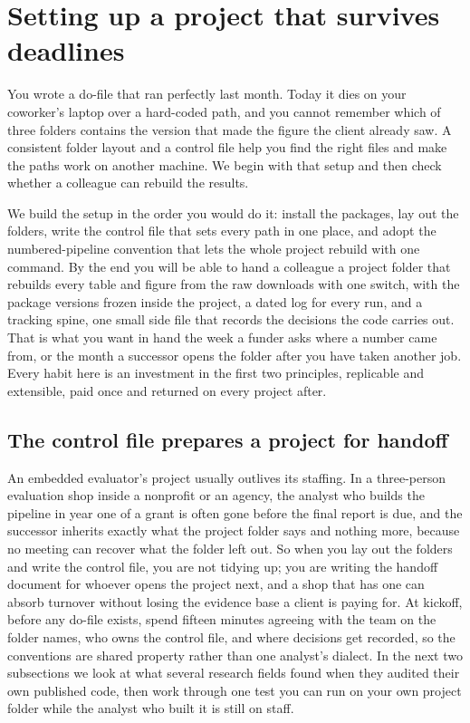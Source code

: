 \documentclass[
    a4paper,
    fontsize=10pt,
    twoside=true,
    numbers=noenddot,
]{kaobook}
\begin{document}
\chapter{Setting up a project that survives deadlines}\label{ch:workshop}

You wrote a do-file that ran perfectly last month. Today it dies on your coworker's laptop over a hard-coded path, and you cannot remember which of three folders contains the version that made the figure the client already saw. A consistent folder layout and a control file help you find the right files and make the paths work on another machine. We begin with that setup and then check whether a colleague can rebuild the results.

We build the setup in the order you would do it: install the packages, lay out the folders, write the control file that sets every path in one place, and adopt the numbered-pipeline convention that lets the whole project rebuild with one command. By the end you will be able to hand a colleague a project folder that rebuilds every table and figure from the raw downloads with one switch, with the package versions frozen inside the project, a dated log for every run, and a tracking spine, one small side file that records the decisions the code carries out. That is what you want in hand the week a funder asks where a number came from, or the month a successor opens the folder after you have taken another job. Every habit here is an investment in the first two principles, replicable and extensible, paid once and returned on every project after.

\section{The control file prepares a project for handoff}\label{sec:ch02-teamscience}
An embedded evaluator's project usually outlives its staffing. In a three-person evaluation shop inside a nonprofit or an agency, the analyst who builds the pipeline in year one of a grant is often gone before the final report is due, and the successor inherits exactly what the project folder says and nothing more, because no meeting can recover what the folder left out. So when you lay out the folders and write the control file, you are not tidying up; you are writing the handoff document for whoever opens the project next, and a shop that has one can absorb turnover without losing the evidence base a client is paying for. At kickoff, before any do-file exists, spend fifteen minutes agreeing with the team on the folder names, who owns the control file, and where decisions get recorded, so the conventions are shared property rather than one analyst's dialect. In the next two subsections we look at what several research fields found when they audited their own published code, then work through one test you can run on your own project folder while the analyst who built it is still on staff.
\end{document}
